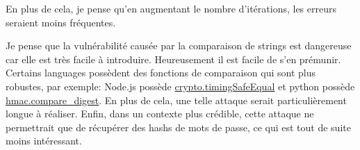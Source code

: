 \documentclass{article}
\begin{document}
En plus de cela, je pense qu'en augmentant le nombre d'itérations, les erreurs seraient moins fréquentes.

Je pense que la vulnérabilité causée par la comparaison de strings est dangereuse car elle est très facile à introduire. Heureusement il est facile de s'en prémunir. Certains languages possèdent des fonctions de comparaison qui sont plus robustes, par exemple: Node.js possède 
\href{https://nodejs.org/api/crypto.html\#cryptotimingsafeequala-b}{crypto.timingSafeEqual} et python possède \href{https://docs.python.org/3/library/hmac.html\#hmac.compare\_digest}{hmac.compare\_digest}. En plus de cela, une telle attaque serait particulièrement longue à réaliser.
Enfin, dans un contexte plus crédible, cette attaque ne permettrait que de récupérer des hashs de mots de passe, ce qui est tout de suite moins intéressant.
\end{document}
